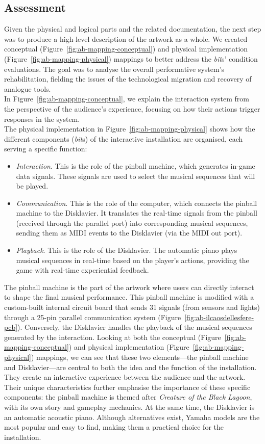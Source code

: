 \subsection*{Assessment}
Given the physical and logical parts and the related documentation, the next step was to produce a high-level description of the artwork as a whole. We created conceptual (Figure~\ref{fig:ab-mapping-conceptual}) and physical implementation (Figure~\ref{fig:ab-mapping-physical}) mappings to better address the \textit{bit}s' condition evaluations. The goal was to analyse the overall performative system’s rehabilitation, fielding the issues of the technological migration and recovery of analogue tools.\\ 
In Figure~\ref{fig:ab-mapping-conceptual}, we explain the interaction system from the perspective of the audience's experience, focusing on how their actions trigger responses in the system. \\
The physical implementation in Figure~\ref{fig:ab-mapping-physical} shows how the different components (\textit{bit}s) of the interactive installation are organised, each serving a specific function:
\begin{itemize}
    \item \textit{Interaction}. This is the role of the pinball machine, which generates in-game data signals. These signals are used to select the musical sequences that will be played.
    \item \textit{Communication}. This is the role of the computer, which connects the pinball machine to the Disklavier. It translates the real-time signals from the pinball (received through the parallel port) into corresponding musical sequences, sending them as MIDI events to the Disklavier (via the MIDI out port).
    \item \textit{Playback}. This is the role of the Disklavier. The automatic piano plays musical sequences in real-time based on the player's actions, providing the game with real-time experiential feedback.
\end{itemize}
The pinball machine is the part of the artwork where users can directly interact to shape the final musical performance. This pinball machine is modified with a custom-built internal circuit board that sends 31 signals (from sensors and lights) through a 25-pin parallel communication system (Figure~\ref{fig:ab-ilcaosdellesfere-pcb}). Conversely, the Disklavier handles the playback of the musical sequences generated by the interaction. Looking at both the conceptual (Figure~\ref{fig:ab-mapping-conceptual}) and physical implementation (Figure~\ref{fig:ab-mapping-physical}) mappings, we can see that these two elements—the pinball machine and Disklavier—are central to both the idea and the function of the installation. They create an interactive experience between the audience and the artwork. Their unique characteristics further emphasise the importance of these specific components: the pinball machine is themed after \textit{Creature of the Black Lagoon}, with its own story and gameplay mechanics. At the same time, the Disklavier is an automatic acoustic piano. Although alternatives exist, Yamaha models are the most popular and easy to find, making them a practical choice for the installation.\\ 
